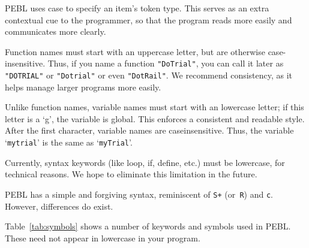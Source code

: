 PEBL uses case to specify an item's token type. This serves as an extra contextual cue to the programmer, so that the program reads more easily and communicates more clearly.

Function names must start with an uppercase letter, but are otherwise
case-insensitive.  Thus, if you name a function \texttt{"DoTrial"}, you can
call it later as \texttt{"DOTRIAL"} or \texttt{"Dotrial"} or even \texttt{"DotRail"}.  We recommend consistency, as it helps manage larger programs more easily.

Unlike function names, variable names must start with an lowercase letter; if this letter is a `g', the variable is global. This enforces a consistent and readable style. After the first character, variable names are caseinsensitive. Thus, the variable `\texttt{mytrial}' is the same as `\texttt{myTrial}'.

Currently, syntax keywords (like loop, if, define, etc.) must be
lowercase, for technical reasons. We hope to eliminate this limitation in the future.

\vfill
{}

PEBL has a simple and forgiving syntax, reminiscent of \texttt{S+} (or\texttt{ R})
and \texttt{c}. However, differences do exist.

Table~\ref{tab:symbols} shows a number of keywords and symbols used in PEBL. These need not appear in lowercase in your program.


